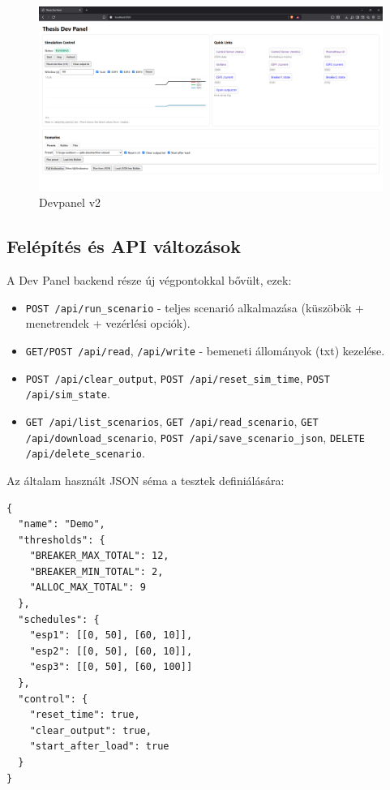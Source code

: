 \begin{figure}[H]
    \centering
    \includegraphics[width=1\textwidth]{figures/devpanel_v2.png}
    \caption{Devpanel v2}
    \label{fig:devpanel}
\end{figure}

\subsection{Felépítés és API változások}
A Dev Panel backend része új végpontokkal bővült, ezek:
\begin{itemize}
  \item \verb|POST /api/run_scenario| \;-\; teljes scenarió alkalmazása 
  (küszöbök + menetrendek + vezérlési opciók).
  \item \verb|GET/POST /api/read|, \verb|/api/write| \;-\; bemeneti állományok (txt) kezelése.
  \item \verb|POST /api/clear_output|, \verb|POST /api/reset_sim_time|, 
  \verb|POST /api/sim_state|.
  \item \verb|GET /api/list_scenarios|, \verb|GET /api/read_scenario|, 
  \verb|GET /api/download_scenario|, \verb|POST /api/save_scenario_json|, 
  \verb|DELETE /api/delete_scenario|.
\end{itemize}

\noindent Az általam használt JSON séma a tesztek definiálására:
\begin{verbatim}
{
  "name": "Demo",
  "thresholds": {
    "BREAKER_MAX_TOTAL": 12,
    "BREAKER_MIN_TOTAL": 2,
    "ALLOC_MAX_TOTAL": 9
  },
  "schedules": {
    "esp1": [[0, 50], [60, 10]],
    "esp2": [[0, 50], [60, 10]],
    "esp3": [[0, 50], [60, 100]]
  },
  "control": {
    "reset_time": true,
    "clear_output": true,
    "start_after_load": true
  }
}
\end{verbatim}

